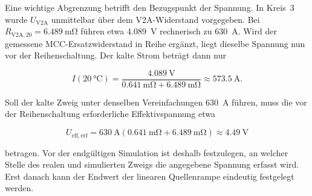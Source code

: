 Eine wichtige Abgrenzung betrifft den Bezugspunkt der Spannung. In Kreis~3
wurde \(U_\mathrm{V2A}\) unmittelbar über dem V2A-Widerstand vorgegeben. Bei
\(R_\mathrm{V2A,20}=\SI{6.489}{\milli\ohm}\) führen etwa
\SI{4.089}{\volt} rechnerisch zu \SI{630}{\ampere}. Wird der gemessene
MCC-Ersatzwiderstand in Reihe ergänzt, liegt dieselbe Spannung nun vor der
Reihenschaltung. Der kalte Strom beträgt dann nur

\begin{equation}
    I(\SI{20}{\degreeCelsius})
    =
    \frac{\SI{4.089}{\volt}}
    {\SI{0.641}{\milli\ohm}+\SI{6.489}{\milli\ohm}}
    \approx
    \SI{573.5}{\ampere}.
    \label{eq:kap5_gesamtmodell_strom_4089v}
\end{equation}

Soll der kalte Zweig unter denselben Vereinfachungen
\SI{630}{\ampere} führen, muss die vor der Reihenschaltung erforderliche
Effektivspannung etwa

\begin{equation}
    U_\mathrm{eff,erf}
    =
    \SI{630}{\ampere}
    \left(
        \SI{0.641}{\milli\ohm}
        +
        \SI{6.489}{\milli\ohm}
    \right)
    \approx
    \SI{4.49}{\volt}
    \label{eq:kap5_gesamtmodell_spannung_erforderlich}
\end{equation}

betragen. Vor der endgültigen Simulation ist deshalb festzulegen, an welcher
Stelle des realen und simulierten Zweigs die angegebene Spannung erfasst wird.
Erst danach kann der Endwert der linearen Quellenrampe eindeutig festgelegt
werden.




